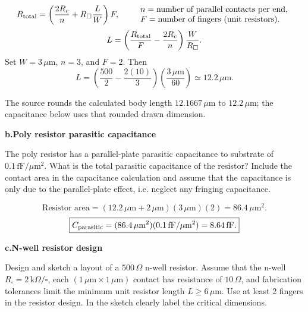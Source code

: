 \solutionlabel
\[
R_{\rm total}=\left(\frac{2R_c}{n}+R_{\square}\frac LW\right)F,
\qquad
\begin{array}{l}
n=\text{number of parallel contacts per end},\\
F=\text{number of fingers (unit resistors)}.
\end{array}
\]
\[
L=\left(\frac{R_{\rm total}}F-\frac{2R_c}n\right)\frac W{R_{\square}}.
\]
Set $W=3\,\mu\mathrm m$, $n=3$, and $F=2$. Then
\[
L=\left(\frac{500}2-\frac{2(10)}3\right)
  \left(\frac{3\,\mu\mathrm m}{60}\right)
  \simeq\boxed{12.2\,\mu\mathrm m}.
\]
\begin{center}
\end{center}
{\small The source rounds the calculated body length $12.1667\,\mu\mathrm m$ to $12.2\,\mu\mathrm m$; the capacitance below uses that rounded drawn dimension.}

\vspace{.2in}
\textbf{b.\quad Poly resistor parasitic capacitance}\par
The poly resistor has a parallel-plate parasitic capacitance to substrate of
$0.1\,\mathrm{fF}/\mu\mathrm m^2$. What is the total parasitic capacitance of the
resistor? Include the contact area in the capacitance calculation and assume
that the capacitance is only due to the parallel-plate effect, i.e. neglect
any fringing capacitance.

\solutionlabel
\[
\text{Resistor area}=(12.2\,\mu\mathrm m+2\,\mu\mathrm m)
 (3\,\mu\mathrm m)(2)=86.4\,\mu\mathrm m^2.
\]
\[
\boxed{C_{\rm parasitic}=(86.4\,\mu\mathrm m^2)
       (0.1\,\mathrm{fF}/\mu\mathrm m^2)=8.64\,\mathrm{fF}.}
\]
\newpage

\textbf{c.\quad N-well resistor design}\par
Design and sketch a layout of a $500\,\Omega$ n-well resistor. Assume that the n-well
$R_{\square}=2\,\mathrm{k}\Omega/\square$, each
$(1\,\mu\mathrm m\times1\,\mu\mathrm m)$ contact has resistance of $10\,\Omega$,
and fabrication tolerances limit the minimum unit resistor length $L\ge6\,\mu\mathrm m$.
Use at least 2 fingers in the resistor design. In the sketch clearly label the critical dimensions.

